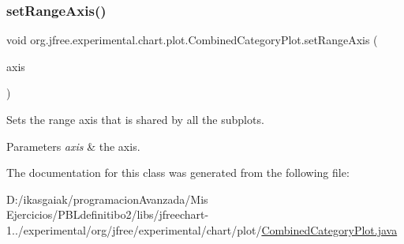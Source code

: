 \subsubsection{\texorpdfstring{set\+Range\+Axis()}{setRangeAxis()}}
{\footnotesize\ttfamily void org.\+jfree.\+experimental.\+chart.\+plot.\+Combined\+Category\+Plot.\+set\+Range\+Axis (\begin{DoxyParamCaption}\item[{\mbox{\hyperlink{classorg_1_1jfree_1_1chart_1_1axis_1_1_value_axis}{Value\+Axis}}}]{axis }\end{DoxyParamCaption})}

Sets the range axis that is shared by all the subplots.


\begin{DoxyParams}{Parameters}
{\em axis} & the axis. \\
\hline
\end{DoxyParams}


The documentation for this class was generated from the following file\+:\begin{DoxyCompactItemize}
\item 
D\+:/ikasgaiak/programacion\+Avanzada/\+Mis Ejercicios/\+P\+B\+Ldefinitibo2/libs/jfreechart-\/1../experimental/org/jfree/experimental/chart/plot/\mbox{\hyperlink{_combined_category_plot_8java}{Combined\+Category\+Plot.\+java}}\end{DoxyCompactItemize}
